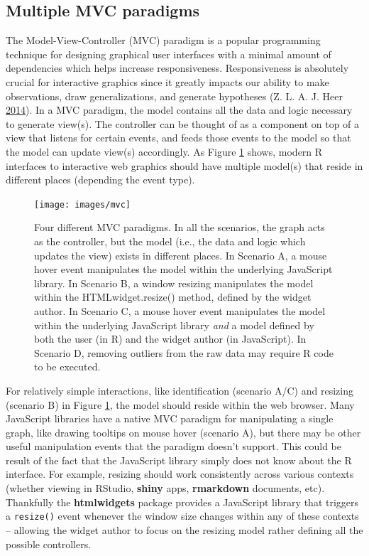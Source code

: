 \documentclass[12pt,]{isuthesis}
\begin{document}
\subsection{Multiple MVC paradigms}\label{multiple-mvc-paradigms}

The Model-View-Controller (MVC) paradigm is a popular programming
technique for designing graphical user interfaces with a minimal amount
of dependencies which helps increase responsiveness. Responsiveness is
absolutely crucial for interactive graphics since it greatly impacts our
ability to make observations, draw generalizations, and generate
hypotheses (Z. L. A. J. Heer
\protect\hyperlink{ref-2014-latency}{2014}). In a MVC paradigm, the
model contains all the data and logic necessary to generate view(s). The
controller can be thought of as a component on top of a view that
listens for certain events, and feeds those events to the model so that
the model can update view(s) accordingly. As Figure \ref{fig:mvc} shows,
modern R interfaces to interactive web graphics should have multiple
model(s) that reside in different places (depending the event type).

\begin{figure}
\centering
\texttt{[image: images/mvc]}
\caption{\label{fig:mvc}Four different MVC paradigms. In all the scenarios,
the graph acts as the controller, but the model (i.e., the data and
logic which updates the view) exists in different places. In Scenario A,
a mouse hover event manipulates the model within the underlying
JavaScript library. In Scenario B, a window resizing manipulates the
model within the HTMLwidget.resize() method, defined by the widget
author. In Scenario C, a mouse hover event manipulates the model within
the underlying JavaScript library \emph{and} a model defined by both the
user (in R) and the widget author (in JavaScript). In Scenario D,
removing outliers from the raw data may require R code to be executed.}
\end{figure}

For relatively simple interactions, like identification (scenario A/C)
and resizing (scenario B) in Figure \ref{fig:mvc}, the model should
reside within the web browser. Many JavaScript libraries have a native
MVC paradigm for manipulating a single graph, like drawing tooltips on
mouse hover (scenario A), but there may be other useful manipulation
events that the paradigm doesn't support. This could be result of the
fact that the JavaScript library simply does not know about the R
interface. For example, resizing should work consistently across various
contexts (whether viewing in RStudio, \textbf{shiny} apps,
\textbf{rmarkdown} documents, etc). Thankfully the \textbf{htmlwidgets}
package provides a JavaScript library that triggers a \texttt{resize()}
event whenever the window size changes within any of these contexts --
allowing the widget author to focus on the resizing model rather
defining all the possible controllers.
\end{document}
